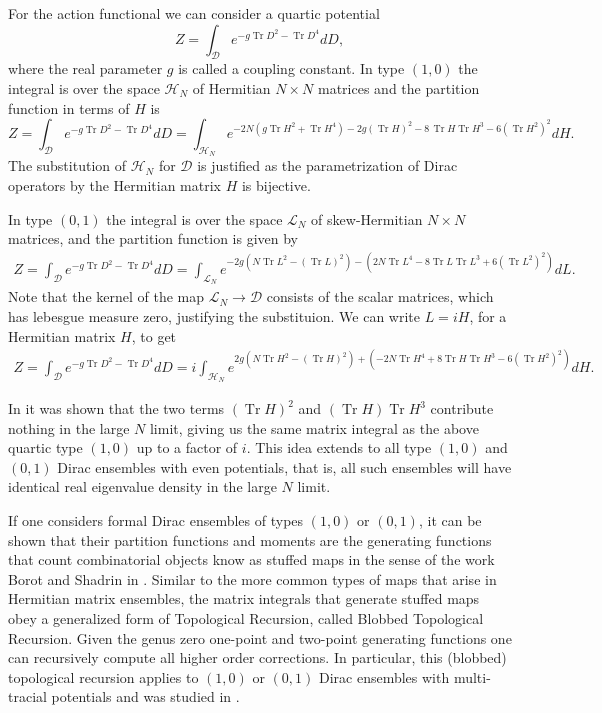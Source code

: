 \documentclass[10pt]{article}
\DeclareMathOperator{\tr}{Tr}
\begin{document}
For the action functional we can consider a quartic potential 
\begin{equation*}
  Z  = \int_{\mathcal{D}} e^{- g \tr D^{2} - \tr D^{4}} dD,
\end{equation*}
where the real parameter $g$ is called a coupling constant. In type $(1,0)$ the integral is over the space $\mathcal{H}_{N}$ of Hermitian $N \times N$ matrices and the partition function in terms of $H$ is 
\begin{equation*}
	Z = \int_{\mathcal{D}}e^{-g \tr D^2 - \tr D^4 }dD = \int_{\mathcal{H}_{N}}e^{-2N(g \tr H^2 +   \tr H^4) -2g (\tr H)^2 - 8 \,\tr H \tr H^3 - 6(\tr H^2)^2 }dH.
\end{equation*}
The substitution of $\mathcal{H}_N$ for $\mathcal{D}$ is justified as the parametrization of Dirac operators by the Hermitian matrix $H$ is bijective.

In type $(0,1)$ the integral is over the space $\mathcal{L}_{N}$ of skew-Hermitian $N\times N$ matrices, and the partition function is given by 
\begin{align*}
	Z = \int_{\mathcal{D}}e^{-g \tr D^2 - \tr D^4 }dD = \int_{\mathcal{L}_{N}}e^{-2g(N \tr L^{2} - (\tr L)^{2}) - \left( 2N \tr L^{4} -8 \tr L \tr L^{3} + 6 (\tr L^{2})^{2}\right)} dL.
\end{align*}
Note that the kernel of the map $\mathcal{L}_N \to \mathcal{D}$ consists of the scalar matrices, which has lebesgue measure zero, justifying the substituion.
We can write  $L =  iH $, for a  Hermitian matrix $H$, to get 
\begin{align*}
	Z = \int_{\mathcal{D}}e^{-g \tr D^2 - \tr D^4 }dD = i\int_{\mathcal{H}_{N}}e^{2 g (N \tr H^{2} - (\tr H)^{2}) +  \left(- 2N \tr H^{4} + 8 \tr H \tr H^{3} - 6(\tr H^{2})^{2}\right)}dH.
\end{align*}

In \cite{First paper} it was shown that the two terms $(\tr H)^2$ and $(\tr H)\tr H^3$ contribute nothing in the large $N$ limit, giving us the same matrix integral as the above quartic type $(1,0)$ up to a factor of $i$. This idea extends to all type $(1,0)$ and $(0,1)$ Dirac ensembles with even potentials, that is, all  such ensembles will have identical real eigenvalue density in the large $N$ limit. 

If one considers formal Dirac ensembles of types $(1,0)$ or $(0,1)$, it can be shown \cite{AK} that their partition functions and moments are the  generating functions that count combinatorial objects know as stuffed maps in the sense of the work Borot and Shadrin in \cite{blobbed1,blobbed2}. Similar to the more common types of maps that arise in Hermitian matrix ensembles, the matrix integrals that generate stuffed maps obey a generalized form of Topological Recursion, called Blobbed Topological Recursion. Given the genus zero one-point and two-point generating functions one can recursively compute all higher order corrections. In particular, this (blobbed) topological recursion applies to $(1,0)$ or $(0,1)$  Dirac  ensembles with multi-tracial potentials and was studied in \cite{AK}.
\end{document}
